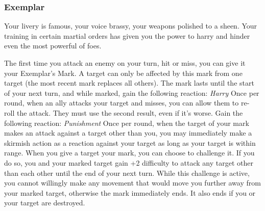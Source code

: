 \subsubsection{Exemplar}

\begin{talent}
{Your livery is famous, your voice brassy, your weapons polished to a sheen. Your training in certain martial orders has given you the power to harry and hinder even the most powerful of foes.}

The first time you attack an enemy on your turn, hit or miss, you can give it your Exemplar’s Mark. A target can only be affected by this mark from one target (the most recent mark replaces all others). 
The mark lasts until the start of your next turn, and while marked, gain the following reaction: 
\textit{Harry} 
\Reaction 
Once per round, when an ally attacks your target and misses, you can allow them to re- roll the attack. They must use the second result, even if it’s worse.
Gain the following reaction: 
\textit{Punishment}
\Reaction 
Once per round, when the target of your mark makes an attack against a target other than you, you may immediately make a skirmish action as a reaction against your target as long as your target is within range.
When you give a target your mark, you can choose to challenge it. If you do so, you and your marked target gain +2 difficulty to attack any target other than each other until the end of your next turn. While this challenge is active, you cannot willingly make any movement that would move you further away from your marked target, otherwise the mark immediately ends. It also ends if you or your target are destroyed.
\end{talent}